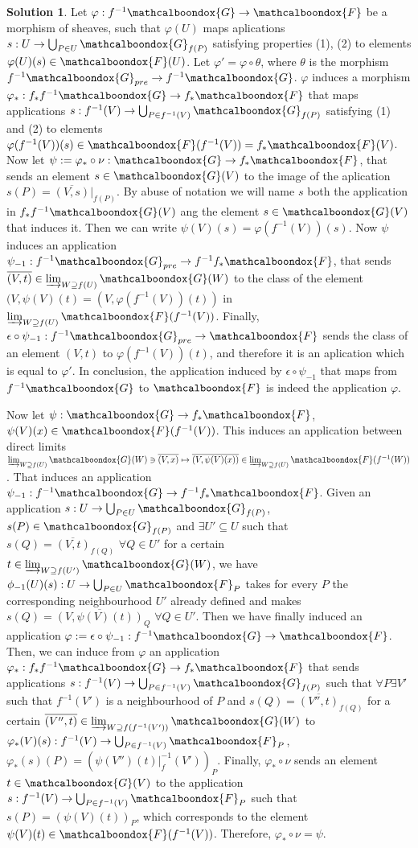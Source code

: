 \documentclass[12pt]{article}
\theoremstyle{definition}
\newtheorem*{sol}{Solution}
\newcommand{\sF}{\ensuremath{\mathcalboondox{F}}}
\newcommand{\sG}{\ensuremath{\mathcalboondox{G}}}
\begin{document}
\begin{sol}
	Let $\varphi: f^{-1}\sG \to \sF$ be a morphism of sheaves, such that $\varphi(U)$ maps aplications $s: U \to \bigcup_{P \in U} \sG_{f(P)}$ satisfying properties (1), (2) to elements $\varphi(U)(s) \in \sF(U)$. Let $\varphi' = \varphi \circ \theta$, where $\theta$ is the morphism $f^{-1}\sG_{pre} \to f^{-1}\sG$. $\varphi$ induces a morphism $\varphi_*: f_*f^{-1}\sG \to f_{*}\sF$ that maps applications $s: f^{-1}(V) \to \bigcup_{P \in f^{-1}(V)} \sG_{f(P)}$ satisfying (1) and (2) to elements $\varphi(f^{-1}(V))(s) \in \sF(f^{-1}(V)) = f_* \sF(V)$. Now let $\psi := \varphi_* \circ \nu : \sG \to f_* \sF$, that sends an element $s \in \sG(V)$ to the image of the aplication $s(P) = \overline{(V,s)}|_{f(P)}$. By abuse of notation we will name $s$ both the application in $f_*f^{-1}\sG(V)$ ang the element $s \in \sG(V)$ that induces it. Then we can write $\psi(V)(s) = \varphi(f^{-1}(V))(s)$. Now $\psi$ induces an application $\psi_{-1}: f^{-1}\sG_{pre} \to f^{-1}f_*\sF$, that sends $\overline{(V,t)} \in \varinjlim_{W \supseteq f(U)} \sG(W)$ to the class of the element $(V,\psi(V)(t) = (V, \varphi(f^{-1}(V))(t))$ in $\varinjlim_{W \supseteq f(U)} \sF(f^{-1}(V))$. Finally, $\epsilon \circ \psi_{-1}: f^{-1}\sG_{pre} \to \sF$ sends the class of an element $(V,t)$ to $\varphi(f^{-1}(V))(t)$, and therefore it is an aplication which is equal to $\varphi'$. In conclusion, the application induced by $\epsilon \circ \psi_{-1}$ that maps from $f^{-1}\sG$ to $\sF$ is indeed the application $\varphi$.

	Now let $\psi: \sG \to f_* \sF$, $\psi(V)(x) \in \sF(f^{-1}(V))$. This induces an application between direct limits $\varinjlim_{W \supseteq f(U)} \sG(W) \ni \overline{(V,x)} \mapsto \overline{(V,\psi(V)(x))} \in \varinjlim_{W \supseteq f(U)} \sF(f^{-1}(W))$. That induces an application $\psi_{-1}: f^{-1}\sG \to f^{-1}f_*\sF$. Given an application $s: U \to \bigcup_{P \in U} \sG_{f(P)}$, $s(P) \in \sG_{f(P)}$ and $\exists U'\subseteq U$ such that $s(Q) = \overline{(V,t)}_{f(Q)} \, \, \forall Q \in U'$ for a certain $t \in \varinjlim_{W \supseteq f(U')} \sG(W)$, we have $\phi_{-1}(U)(s): U \to \bigcup_{P \in U} \sF_P$ takes for every $P$ the corresponding neighbourhood $U'$ already defined and makes $s(Q) = \overline{(V, \psi(V)(t))}_{Q} \, \, \forall Q \in U'$. Then we have finally induced an application $\varphi:= \epsilon \circ \psi_{-1}: f^{-1}\sG \to \sF$. Then, we can induce from $\varphi$ an application $\varphi_*: f_*f^{-1}\sG \to f_* \sF$ that sends applications $s: f^{-1}(V) \to \bigcup_{P \in f^{-1}(V)} \sG_{f(P)}$ such that $\forall P \exists V'$ such that $f^{-1}(V')$ is a neighbourhood of $P$ and $s(Q) = \overline{(V'',t)}_{f(Q)}$ for a certain $\overline{(V'',t)} \in \varinjlim_{W \supseteq f(f^{-1}(V'))} \sG(W)$ to $\varphi_*(V)(s): f^{-1}(V) \to \bigcup_{P \in f^{-1}(V)} \sF_P$, $\varphi_*(s)(P) = (\psi(V'')(t)|_f^{-1}(V'))_P$. Finally, $\varphi_* \circ \nu$ sends an element $t \in \sG(V)$ to the application $s: f^{-1}(V) \to \bigcup_{P \in f^{-1}(V)} \sF_P$ such that $s(P) = (\psi(V)(t))_{P}$, which corresponds to the element $\psi(V)(t) \in \sF(f^{-1}(V))$. Therefore, $\varphi_* \circ \nu = \psi$.


\end{sol}
\end{document}
